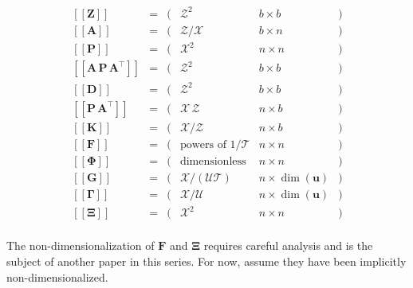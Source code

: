 \documentclass[10pt,oneside,x11names]{article}
\begin{document}
\begin{equation}
\label{eqn:dimensional-breakdown}
\begin{array}{lccccr}
\left[\left[\mathbold{Z}\right]\right]                                       &=& (&\mathcal{Z}^2            & b\times{b}&) \\
\left[\left[\mathbold{A}\right]\right]                                       &=& (&\mathcal{Z}/\mathcal{X}  & b\times{n}&) \\
\left[\left[\mathbold{P}\right]\right]                                       &=& (&\mathcal{X}^2            & n\times{n}&) \\
\left[\left[\mathbold{A}\,\mathbold{P}\,\mathbold{A}^\intercal\right]\right] &=& (&\mathcal{Z}^2            & b\times{b}&) \\
\left[\left[\mathbold{D}\right]\right]                                       &=& (&\mathcal{Z}^2            & b\times{b}&) \\
\left[\left[\mathbold{P}\,\mathbold{A}^\intercal\right]\right]               &=& (&\mathcal{X}\,\mathcal{Z} & n\times{b}&) \\
\left[\left[\mathbold{K}\right]\right]                                       &=& (&\mathcal{X}/\mathcal{Z}  & n\times{b}&) \\
\left[\left[\mathbold{F}\right]\right]                                       &=& (&\textrm{powers of } 1/\mathcal{T}            & n\times{n}&) \\
\left[\left[\mathbold{\Phi}\right]\right]                                    &=& (&\textrm{dimensionless}   & n\times{n}&) \\
\left[\left[\mathbold{G}\right]\right]                                       &=& (&\mathcal{X}/(\mathcal{U}\mathcal{T}) & n\times{\dim(\mathbold{u})}&) \\
\left[\left[\mathbold{\Gamma}\right]\right]                                  &=& (&\mathcal{X}/\mathcal{U}  & n\times{\dim(\mathbold{u})}&) \\
\left[\left[\mathbold{\Xi}\right]\right]                                     &=& (&\mathcal{X}^2            & n\times{n}&) \\
\end{array}
\end{equation}

The non-dimensionalization of \(\mathbold{F}\) and \(\mathbold{\Xi}\) requires
careful analysis and is the subject of another paper in this series. For now,
assume they have been implicitly non-dimensionalized.
\end{document}
